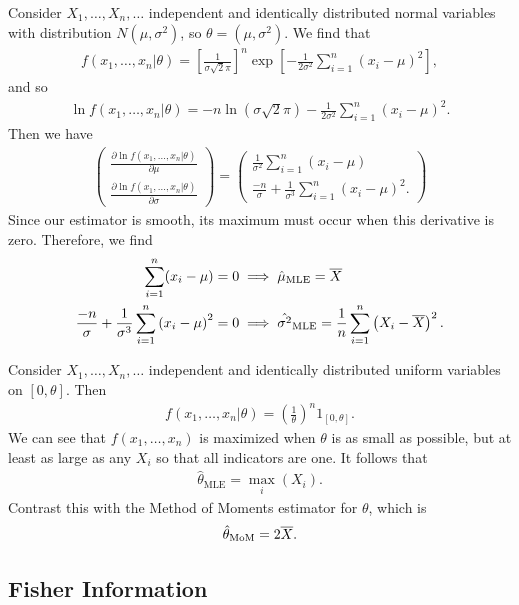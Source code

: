 \begin{exmp}
    Consider $X_1, \ldots, X_n, \ldots$ independent and identically distributed normal variables with distribution $N(\mu, \sigma^2)$, so $\theta = (\mu, \sigma^2)$. We find that
    \begin{align*}
        f\left(x_1, \ldots, x_n|\theta\right) = \left[\frac{1}{\sigma\sqrt{2}\pi}\right]^{n}\exp\left[-\frac{1}{2\sigma^2}\sum_{i=1}^{n}\left(x_i-\mu\right)^2\right],
    \end{align*}
    and so
    \begin{align*}
        \ln f\left(x_1, \ldots, x_n|\theta\right) = -n\ln(\sigma\sqrt{2}\pi) -\frac{1}{2\sigma^2}\sum_{i=1}^{n}\left(x_i-\mu\right)^2.
    \end{align*}
    Then we have
    \begin{align*}
        \begin{pmatrix}
            \frac{\partial \ln f\left(x_1, \ldots, x_n|\theta\right)}{\partial \mu} \\
            \frac{\partial \ln f\left(x_1, \ldots, x_n|\theta\right)}{\partial \sigma}
        \end{pmatrix} = \begin{pmatrix}
            \frac{1}{\sigma^2}\sum_{i=1}^{n}\left(x_i-\mu\right) \\
            \frac{-n}{\sigma} + \frac{1}{\sigma^3}\sum_{i=1}^{n}\left(x_i-\mu\right)^2.
        \end{pmatrix}
    \end{align*}
    Since our estimator is smooth, its maximum must occur when this derivative is zero. Therefore, we find
    \begin{align*}
        \sum_{i=1}^{n}(x_i - \mu) &= 0 \implies \hat{\mu}_{\textrm{MLE}} = \overline{X} \\
        \frac{-n}{\sigma} + \frac{1}{\sigma^3}\sum_{i=1}^{n}\left(x_i-\mu\right)^2 &= 0 \implies \hat{\sigma^2}_{\textrm{MLE}} = \frac{1}{n}\sum_{i=1}^{n}\left(X_i-\overline{X}\right)^2.
    \end{align*}
\end{exmp}

\begin{exmp}
    Consider $X_1, \ldots, X_n, \ldots$ independent and identically distributed uniform variables on $[0, \theta]$. Then
    \begin{align*}
        f(x_1, \ldots, x_n|\theta) = \left(\frac{1}{\theta}\right)^{n}1_{[0, \theta]}.
    \end{align*}
    We can see that $f(x_1, \ldots, x_n)$ is maximized when $\theta$ is as small as possible, but at least as large as any $X_i$ so that all indicators are one. It follows that
    \begin{align*}
        \hat{\theta}_{\textrm{MLE}} = \max_{i}(X_i).
    \end{align*}
    Contrast this with the Method of Moments estimator for $\theta$, which is
    \begin{align*}
        \hat{\theta}_{\textrm{MoM}} = 2\overline{X}.
    \end{align*}
\end{exmp}

\subsection{Fisher Information}
